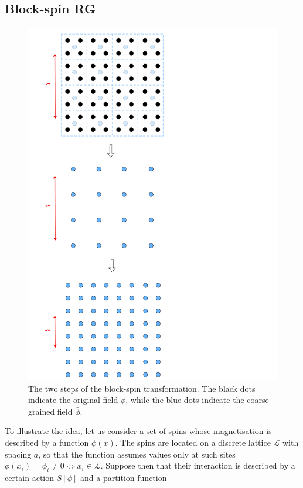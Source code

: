 \subsection{Block-spin RG}
\label{sec:blockspin}
\begin{figure}
    \centering 
    \includegraphics[angle=90,scale=0.34]{figures/blockspin.pdf}
    \caption[Block-spin transformation]{The two steps of the block-spin transformation. The black dots indicate the original field $\phi$, while the blue dots indicate the coarse grained field $\bar \phi$.}
    \label{fig:blockin_first}
\end{figure}
To illustrate the idea, let us consider a set of spins whose magnetisation is described by a function $\phi(x)$. The spins are located on a discrete lattice $\mathscr{L}$ with spacing $a$, so that the function assumes values only at such sites $\phi(x_i) = \phi_i \neq 0 \Leftrightarrow x_i \in \mathscr{L}$. Suppose then that their interaction is described by a certain action $S[\phi]$ and a partition function
